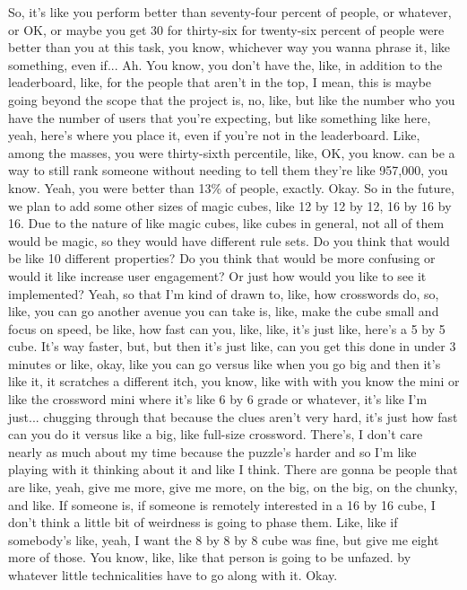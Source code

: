 \documentclass{article}
\begin{document}
So, it's like you perform better than seventy-four percent of people, or whatever, or OK, or maybe you get 30 for thirty-six for twenty-six percent of people were better than you at this task, you know, whichever way you wanna phrase it, like something, even if...
Ah.
You know, you don't have the, like, in addition to the leaderboard, like, for the people that aren't in the top, I mean, this is maybe going beyond the scope that the project is, no, like, but like the number who you have the number of users that you're expecting, but like something like here, yeah, here's where you place it, even if you're not in the leaderboard.
Like, among the masses, you were thirty-sixth percentile, like, OK, you know.
can be a way to still rank someone without needing to tell them they're like 957,000, you know.
Yeah, you were better than 13\% of people, exactly.
Okay.
So in the future, we plan to add some other sizes of magic cubes, like 12 by 12 by 12, 16 by 16 by 16.
Due to the nature of like magic cubes, like cubes in general, not all of them would be magic, so they would have different rule sets. Do you think that would be like 10 different properties? Do you think that would be more confusing or would it like increase user engagement? Or just how would you like to see it implemented?
Yeah, so that I'm kind of drawn to, like, how crosswords do, so, like, you can go another avenue you can take is, like, make the cube small and focus on speed, be like, how fast can you, like, like, it's just like, here's a 5 by 5 cube.
It's way faster, but, but then it's just like, can you get this done in under 3 minutes or like, okay, like you can go versus like when you go big and then it's like it, it scratches a different itch, you know, like with with you know the mini or like the crossword mini where it's like 6 by 6 grade or whatever, it's like I'm just...
chugging through that because the clues aren't very hard, it's just how fast can you do it versus like a big, like full-size crossword. There's, I don't care nearly as much about my time because the puzzle's harder and so I'm like playing with it thinking about it and like I think.
There are gonna be people that are like, yeah, give me more, give me more, on the big, on the big, on the chunky, and like.
If someone is, if someone is remotely interested in a 16 by 16 cube, I don't think a little bit of weirdness is going to phase them. Like, like if somebody's like, yeah, I want the 8 by 8 by 8 cube was fine, but give me eight more of those. You know, like, like that person is going to be unfazed.
by whatever little technicalities have to go along with it. Okay.
\end{document}
